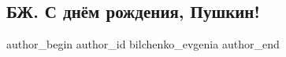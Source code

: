 
 
 
 
 
 
\subsection{БЖ. С днём рождения, Пушкин!}
\label{sec:07_06_2021.fb.bilchenko_evgenia.3.pushkin_birthday}
\ifcmt
 author_begin
   author_id bilchenko_evgenia
 author_end
\fi

